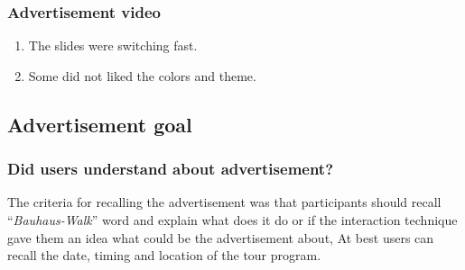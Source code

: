 \subsubsection{Advertisement video}
\begin{enumerate}
\item The slides were switching fast.
\item Some did not liked the colors and theme. 
\end{enumerate}


\subsection{Advertisement goal}

\subsubsection{Did users understand about advertisement?}

	The criteria for recalling the advertisement was that participants should recall ``\emph{Bauhaus-Walk}'' word and explain what does it do or if the interaction technique gave them an idea what could be the advertisement about, At best users can recall the date, timing and location of the tour program.

